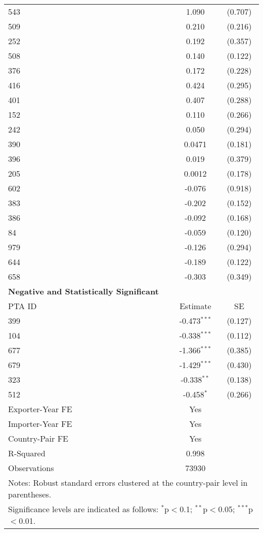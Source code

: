 \begin{longtable}{lcc}
    543 & 1.090 & (0.707) \\
    509 & 0.210 & (0.216) \\
    252 & 0.192 & (0.357) \\
    508 & 0.140 & (0.122) \\
    376 & 0.172 & (0.228) \\
    416 & 0.424 & (0.295) \\
    401 & 0.407 & (0.288) \\
    152 & 0.110 & (0.266) \\
    242 & 0.050 & (0.294) \\
    390 & 0.0471 & (0.181) \\
    396 & 0.019 & (0.379) \\
    205 & 0.0012 & (0.178) \\
    602 & -0.076 & (0.918) \\
    383 & -0.202 & (0.152) \\
    386 & -0.092 & (0.168) \\
    84  & -0.059 & (0.120) \\
    979  & -0.126 & (0.294) \\
    644  & -0.189 & (0.122) \\
    658  & -0.303 & (0.349) \\
    \hline
    \textbf{Negative and Statistically Significant} &  &  \\
    \hline
    PTA ID & Estimate & SE \\
    \hline
    399 & -0.473$^{\ast\ast\ast}$ & (0.127) \\
    104 & -0.338$^{\ast\ast\ast}$ & (0.112) \\
    677 & -1.366$^{\ast\ast\ast}$ & (0.385) \\
    679 & -1.429$^{\ast\ast\ast}$ & (0.430) \\
    323 & -0.338$^{\ast\ast}$ & (0.138) \\
    512 & -0.458$^{\ast}$ & (0.266) \\
    \hline
    Exporter-Year FE & Yes \\
    Importer-Year FE & Yes \\
    Country-Pair FE & Yes \\
    R-Squared & 0.998 \\
    Observations & 73930 \\
    \hline
    \multicolumn{3}{l}{\footnotesize{Notes: Robust standard errors clustered at the country-pair level in parentheses.}} \\
    \multicolumn{3}{l}{\footnotesize{Significance levels are indicated as follows: $^{\ast}$p$<$0.1; $^{\ast\ast}$p$<$0.05; $^{\ast\ast\ast}$p$<$0.01.}} \\
\end{longtable}    


